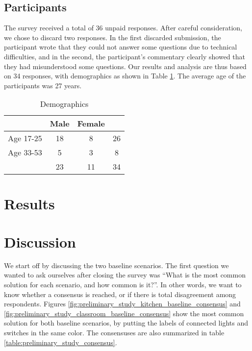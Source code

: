     \subsection{Participants} \label{subsec:explor:survey:participants}
    The survey received a total of 36 unpaid responses. After careful consideration, we chose to discard two responses. In the first discarded submission, the participant wrote that they could not answer some questions due to technical difficulties, and in the second, the participant's commentary clearly showed that they had misunderstood some questions. Our results and analysis are thus based on 34 responses, with demographics as shown in Table \ref{table:explor:demographics}. The average age of the participants was 27 years.

        \begin{table}
        \centering
            \begin{tabular}{|c|c c|c|} 
            \hline
                      & Male & Female &    \\
            \hline
            Age 17-25 &   18 &      8 & 26 \\
            Age 33-53 &    5 &      3 &  8 \\
            \hline
                      &   23 &     11 & 34 \\
            \hline
            \end{tabular}
        \caption{Demographics}
        \label{table:explor:demographics}
        \end{table}

\section{Results} \label{sec:explor:results}

\section{Discussion} \label{sec:explor:discussion}
We start off by discussing the two baseline scenarios. The first question we wanted to ask ourselves after closing the survey was ``What is the most common solution for each scenario, and how common is it?''. In other words, we want to know whether a consensus is reached, or if there is total disagreement among respondents. Figures \ref{fig:preliminary_study_kitchen_baseline_consensus} and \ref{fig:preliminary_study_classroom_baseline_consensus} show the most common solution for both baseline scenarios, by putting the labels of connected lights and switches in the same color. The consensuses are also summarized in table \ref{table:preliminary_study_consensus}.

